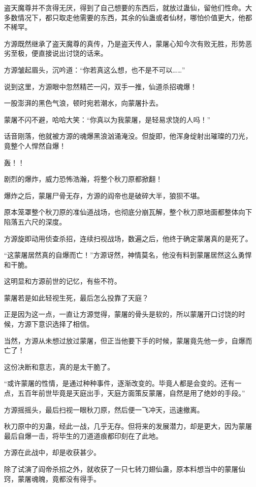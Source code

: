 \begin{this_body}
盗天魔尊并不贪得无厌，得到了自己想要的东西后，就放过蛊仙，留他们性命。大多数情况下，都只取走他需要的东西，其余的仙蛊或者仙材，哪怕价值更大，他都不稀罕。

方源既然继承了盗天魔尊的真传，乃是盗天传人，蒙屠心知今次有败无胜，形势恶劣至极，便直接说出讨饶的话来。

方源皱起眉头，沉吟道：“你若真这么想，也不是不可以……”

说到这里，方源眼中忽然精芒一闪，双手一推，仙道杀招魂爆！

一股澎湃的黑色气浪，顿时宛若潮水，向蒙屠扑去。

蒙屠不闪不避，哈哈大笑：“你真以为我蒙屠，是轻易求饶的人吗！”

话音刚落，他就被方源的魂爆黑浪汹涌淹没。但旋即，他浑身绽射出璀璨的刀光，竟整个人悍然自爆！

轰！！

剧烈的爆炸，威力恐怖浩瀚，将整个秋刀原都掀翻！

爆炸之后，蒙屠尸骨无存，方源的阎帝也是破碎大半，狼狈不堪。

原本笼罩整个秋刀原的准仙道战场，也彻底分崩瓦解，整个秋刀原地面都整体向下陷落五六尺的深度。

方源旋即动用侦查杀招，连续扫视战场，数遍之后，他终于确定蒙屠真的是死了。

“这蒙屠居然真的自爆而亡！”方源讶然，神情莫名，他没有料到蒙屠居然这么勇悍和干脆。

这明显和方源前世的记忆，有些不符。

蒙屠若是如此轻视生死，最后怎么投靠了天庭？

正是因为这一点，一直让方源觉得，蒙屠的骨头是软的，所以蒙屠开口讨饶的时候，方源下意识选择了相信。

当然，方源从未想过放过蒙屠，但正当他要下手的时候，蒙屠竟先他一步，自爆而亡了！

这份决断和意志，真的是太干脆了。

“或许蒙屠的性情，是通过种种事件，逐渐改变的。毕竟人都是会变的。还有一点，五百年前世毕竟是天庭出手，天庭方面策反蒙屠，自然是用了绝妙的手段。”

方源摇摇头，最后扫视一眼秋刀原，然后便一飞冲天，迅速撤离。

秋刀原中的刃蛊，经此一战，几乎无存。但将来的发展潜力，却是更大，因为蒙屠最后自爆一击，将毕生的刀道道痕都印刻在了此地。

方源在此战中，却是收获甚少。

除了试演了阎帝杀招之外，就收获了一只七转刀翅仙蛊，原本料想当中的蒙屠仙窍，蒙屠魂魄，竟都没有得手。


\end{this_body}
